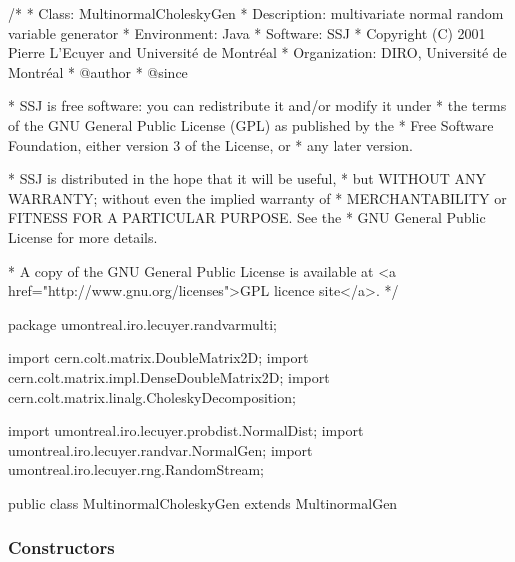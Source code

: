 \begin{code}
\begin{hide}
/*
 * Class:        MultinormalCholeskyGen
 * Description:  multivariate normal random variable generator
 * Environment:  Java
 * Software:     SSJ 
 * Copyright (C) 2001  Pierre L'Ecuyer and Université de Montréal
 * Organization: DIRO, Université de Montréal
 * @author       
 * @since

 * SSJ is free software: you can redistribute it and/or modify it under
 * the terms of the GNU General Public License (GPL) as published by the
 * Free Software Foundation, either version 3 of the License, or
 * any later version.

 * SSJ is distributed in the hope that it will be useful,
 * but WITHOUT ANY WARRANTY; without even the implied warranty of
 * MERCHANTABILITY or FITNESS FOR A PARTICULAR PURPOSE.  See the
 * GNU General Public License for more details.

 * A copy of the GNU General Public License is available at
   <a href="http://www.gnu.org/licenses">GPL licence site</a>.
 */
\end{hide}
package umontreal.iro.lecuyer.randvarmulti;

   import cern.colt.matrix.DoubleMatrix2D;
   import cern.colt.matrix.impl.DenseDoubleMatrix2D;
   import cern.colt.matrix.linalg.CholeskyDecomposition;
\begin{hide}
import umontreal.iro.lecuyer.probdist.NormalDist;
import umontreal.iro.lecuyer.randvar.NormalGen;
import umontreal.iro.lecuyer.rng.RandomStream;
\end{hide}

public class MultinormalCholeskyGen extends MultinormalGen\begin{hide} {

   private void initL() {
      if (mu.length != sigma.rows() || mu.length != sigma.columns())
         throw new IllegalArgumentException
            ("Incompatible mean vector and covariance matrix");
      CholeskyDecomposition decomp = new CholeskyDecomposition (sigma);
      //if (!decomp.isSymmetricPositiveDefinite())
      //   throw new IllegalArgumentException
      //      ("The covariance matrix must be symmetric and positive-definite");
      sqrtSigma = decomp.getL();
   }\end{hide}
\end{code}

\subsubsection*{Constructors}


